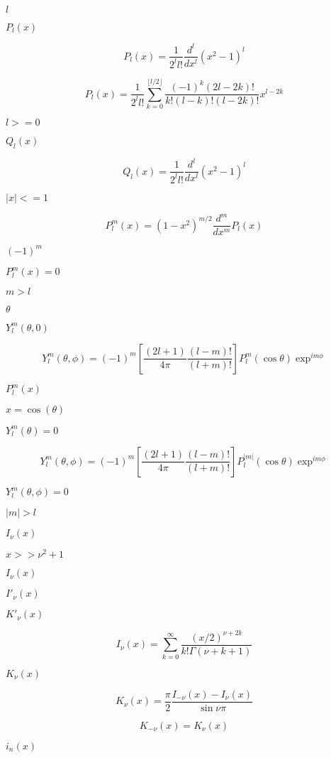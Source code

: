 \documentclass{article}
\begin{document}
$ l $
\pagebreak

$ P_l(x) $
\pagebreak

\[ P_l(x) = \frac{1}{2^l l!}\frac{d^l}{dx^l}(x^2 - 1)^{l} \]
\pagebreak

\[ P_l(x) = \frac{1}{2^l l!}\sum_{k=0}^{\lfloor l/2 \rfloor} \frac{(-1)^k(2l-2k)!}{k!(l-k)!(l-2k)!}x^{l-2k} \]
\pagebreak

$ l >= 0 $
\pagebreak

$ Q_l(x) $
\pagebreak

\[ Q_l(x) = \frac{1}{2^l l!}\frac{d^l}{dx^l}(x^2 - 1)^{l} \]
\pagebreak

$ |x| <= 1 $
\pagebreak

\[ P_l^m(x) = (1 - x^2)^{m/2}\frac{d^m}{dx^m}P_l(x) \]
\pagebreak

$ (-1)^m $
\pagebreak

$ P_l^m(x) = 0 $
\pagebreak

$ m > l $
\pagebreak

$ \theta $
\pagebreak

$ Y_l^m(\theta,0) $
\pagebreak

\[ Y_l^m(\theta,\phi) = (-1)^m[\frac{(2l+1)}{4\pi} \frac{(l-m)!}{(l+m)!}] P_l^m(\cos\theta) \exp^{im\phi} \]
\pagebreak

$ P_l^m(x) $
\pagebreak

$x = \cos(\theta)$
\pagebreak

$ Y_l^m(\theta) = 0 $
\pagebreak

\[ Y_l^m(\theta,\phi) = (-1)^m[\frac{(2l+1)}{4\pi} \frac{(l-m)!}{(l+m)!}] P_l^{|m|}(\cos\theta) \exp^{im\phi} \]
\pagebreak

$ Y_l^m(\theta,\phi) = 0 $
\pagebreak

$ |m| > l $
\pagebreak

$ I_{\nu}(x) $
\pagebreak

$ x >> \nu^2 + 1 $
\pagebreak

$ I_\nu(x) $
\pagebreak

$ I'_\nu(x) $
\pagebreak

$ K'_\nu(x) $
\pagebreak

\[ I_{\nu}(x) = \sum_{k=0}^{\infty} \frac{(x/2)^{\nu + 2k}}{k!\Gamma(\nu+k+1)} \]
\pagebreak

$ K_{\nu}(x) $
\pagebreak

\[ K_{\nu}(x) = \frac{\pi}{2} \frac{I_{-\nu}(x) - I_{\nu}(x)}{\sin \nu\pi} \]
\pagebreak

\[ K_{-\nu}(x) = K_{\nu}(x) \]
\pagebreak

$ i_n(x) $
\pagebreak
\end{document}
